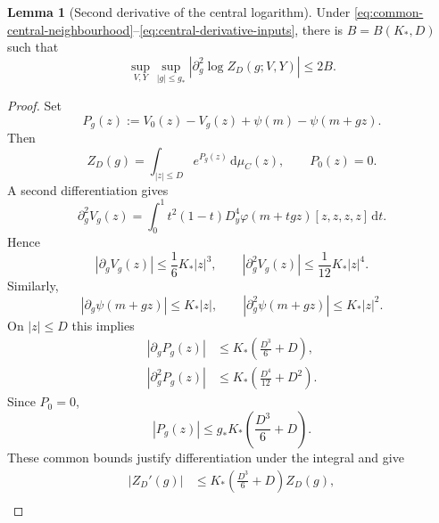 \documentclass[10pt,reqno]{amsart}
\theoremstyle{definition}
\newtheorem{lemma}[definition]{Lemma}
\theoremstyle{remark}
\numberwithin{equation}{section}
\numberwithin{figure}{section}
\newcommand{\dd}{\mathrm d}
\begin{document}
\begin{lemma}[Second derivative of the central logarithm]\label{lem:central-log-second}
Under \eqref{eq:common-central-neighbourhood}--\eqref{eq:central-derivative-inputs},
there is $B=B(K_*,D)$ such that
\begin{equation}\label{eq:central-log-second}
\sup_{V,Y}\sup_{|g|\le g_*}
\left|\partial_g^2\log Z_D(g;V,Y)\right|\le2B.
\end{equation}
\end{lemma}
\begin{proof}
Set
\begin{equation}\label{eq:central-P-definition}
P_g(z):=V_0(z)-V_g(z)+\psi(m)-\psi(m+gz).
\end{equation}
Then
\begin{equation}\label{eq:central-P-zero}
Z_D(g)=\int_{|z|\le D}e^{P_g(z)}\,\dd\mu_C(z),\qquad P_0(z)=0.
\end{equation}
A second differentiation gives
\begin{equation}\label{eq:second-taylor-g-derivative}
\partial_g^2V_g(z)
=\int_0^1t^2(1-t)D_y^4\varphi(m+tgz)[z,z,z,z]\,\dd t.
\end{equation}
Hence
\begin{equation}\label{eq:taylor-g-derivative-bounds}
|\partial_gV_g(z)|\le\frac16K_*|z|^3,\qquad
|\partial_g^2V_g(z)|\le\frac1{12}K_*|z|^4.
\end{equation}
Similarly,
\begin{equation}\label{eq:haar-g-derivative-bounds}
|\partial_g\psi(m+gz)|\le K_*|z|,\qquad
|\partial_g^2\psi(m+gz)|\le K_*|z|^2.
\end{equation}
On $|z|\le D$ this implies
\begin{equation}\label{eq:central-P-derivative-bounds}
\begin{aligned}
|\partial_gP_g(z)|&\le K_*\left(\frac{D^3}{6}+D\right),\\
|\partial_g^2P_g(z)|&\le K_*\left(\frac{D^4}{12}+D^2\right).
\end{aligned}
\end{equation}
Since $P_0=0$,
\begin{equation}\label{eq:central-P-value-bound}
|P_g(z)|\le g_*K_*\left(\frac{D^3}{6}+D\right).
\end{equation}
These common bounds justify differentiation under the integral and give
\begin{equation}\label{eq:central-Z-derivative-bounds}
\begin{aligned}
|Z_D'(g)|&\le K_*\left(\frac{D^3}{6}+D\right)Z_D(g),\\

\end{aligned}
\end{equation}
\end{proof}
\end{document}

